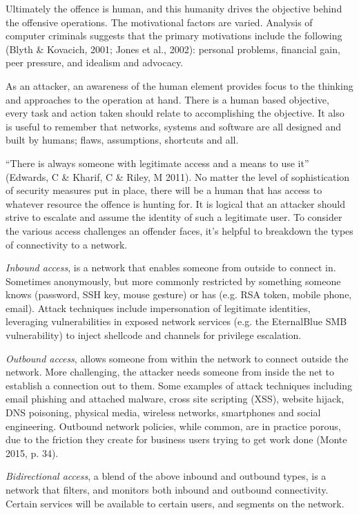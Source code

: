 \documentclass[11pt]{report}
\begin{document}
Ultimately the offence is human, and this humanity drives the objective behind the offensive operations. The motivational factors are varied. Analysis of computer criminals suggests that the primary motivations include the following (Blyth \& Kovacich, 2001; Jones et al., 2002): personal problems, financial gain, peer pressure, and idealism and advocacy.

As an attacker, an awareness of the human element provides focus to the thinking and approaches to the operation at hand. There is a human based objective, every task and action taken should relate to accomplishing the objective. It also is useful to remember that networks, systems and software are all designed and built by humans; flaws, assumptions, shortcuts and all.

``There is always someone with legitimate access and a means to use it'' (Edwards, C \& Kharif, C \& Riley, M 2011). No matter the level of sophistication of security measures put in place, there will be a human that has access to whatever resource the offence is hunting for. It is logical that an attacker should strive to escalate and assume the identity of such a legitimate user. To consider the various access challenges an offender faces, it’s helpful to breakdown the types of connectivity to a network.

\textit{Inbound access}, is a network that enables someone from outside to connect in. Sometimes anonymously, but more commonly restricted by something someone knows (password, SSH key, mouse gesture) or has (e.g. RSA token, mobile phone, email). Attack techniques include impersonation of legitimate identities, leveraging vulnerabilities in exposed network services (e.g. the EternalBlue SMB vulnerability) to inject shellcode and channels for privilege escalation.

\textit{Outbound access}, allows someone from within the network to connect outside the network. More challenging, the attacker needs someone from inside the net to establish a connection out to them. Some examples of attack techniques including email phishing and attached malware, cross site scripting (XSS), website hijack, DNS poisoning, physical media, wireless networks, smartphones and social engineering. Outbound network policies, while common, are in practice porous, due to the friction they create for business users trying to get work done (Monte 2015, p. 34).

\textit{Bidirectional access}, a blend of the above inbound and outbound types, is a network that filters, and monitors both inbound and outbound connectivity. Certain services will be available to certain users, and segments on the network.
\end{document}
